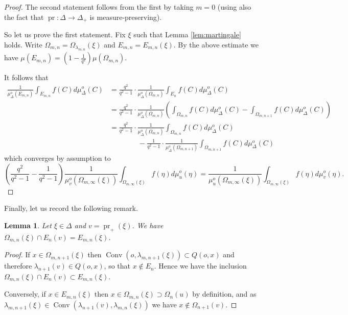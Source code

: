 \documentclass[a4paper, 11pt]{article}
\theoremstyle{plain}
\newtheorem{lemma}[proposition]{Lemma}
\theoremstyle{definition}
\theoremstyle{remark}
\DeclareMathOperator{\Conv}{Conv}
\DeclareMathOperator{\pr}{pr}
\begin{document}
\begin{proof}
The second statement follows from the first by taking $m=0$ (using also the fact that $\pr:\Delta\to\Delta_+$ is measure-preserving).

So let us prove the first statement.
Fix $\xi$ such that Lemma \ref{lem:martingale} holds.
Write $\Omega_{m,n}=\Omega_{\lambda_{m,n}}(\xi)$ and $E_{m,n}=E_{m,n}(\xi)$. 
   By the above estimate we have $\mu(E_{m,n})=(1-\frac{1}{q^2})\mu(\Omega_{m,n})$.

    It follows that
     \begin{align*}
         \frac{1}{\mu_\Delta^o(E_{m,n})}\int_{E_{m,n}} f(C)d\mu_\Delta^o(C) &= \frac{q^2}{q^2-1}\cdot  \frac{1}{\mu_\Delta^o (\Omega_{m,n})} 
         \int_{E_n} f(C)d\mu_\Delta^o(C)\\
         &=\frac{q^2}{q^2-1}\cdot  \frac{1}{\mu_\Delta^o (\Omega_{m,n})} \left(
         \int_{\Omega_{m,n}} f(C)d\mu_\Delta^o(C)-\int_{\Omega_{m,n+1}} f(C)d\mu_\Delta^o(C)\right)\\
         &= 
             \frac{q^2}{q^2-1}\cdot \frac{1}{\mu_\Delta^o (\Omega_{m,n})}\int_{\Omega_{m,n}} f(C)d\mu_\Delta^o(C) 
             \\  & \qquad \qquad- \frac{1}{q^2-1}\cdot \frac{1}{\mu_{\Delta}^o(\Omega_{m,n+1})}\int_{\Omega_{m,n+1}} f(C)d\mu_\Delta^o(C)
     \end{align*}
     which converges by assumption to $$(\frac{q^2}{q^2-1}-\frac{1}{q^2-1})\frac 1{\mu_v^o(\Omega_{m,\infty}(\xi))}\int_{\Omega_{m,\infty}(\xi)} f(\eta) d\mu_u ^o(\eta)=\frac 1{\mu_u^o(\Omega_{m,\infty}(\xi))}\int_{\Omega_{m,\infty}(\xi)} f(\eta) d\mu_v ^o(\eta).$$
\end{proof}

Finally, let us record the following remark.

\begin{lemma}\label{lem:Enmintersection}
    Let $\xi\in \Delta$ and $v=\pr_+(\xi)$. We have $\Omega_{m,n}(\xi)\cap E_n(v)= E_{m,n}(\xi)$.
\end{lemma}

\begin{proof}
    If $x\in \Omega_{m,n+1}(\xi)$ then $\Conv(o,\lambda_{m,n+1}(\xi))\subset Q(o,x)$ and therefore $\lambda_{n+1}(v)\in Q(o,x)$, so that $x\not \in E_n$. Hence we have the inclusion $\Omega_{m,n}(\xi)\cap E_n(v)\subset E_{m,n}(\xi)$.

    Conversely, if $x\in E_{m,n}(\xi)$ then $x\in \Omega_{m,n}(\xi)\supset \Omega_n(u)$ by definition, and as $\lambda_{m,n+1}(\xi)\in \Conv(\lambda_{n+1}(v),\lambda_{m,n}(\xi))$ we have $x\not\in \Omega_{n+1}(v)$. 
\end{proof}
\end{document}
